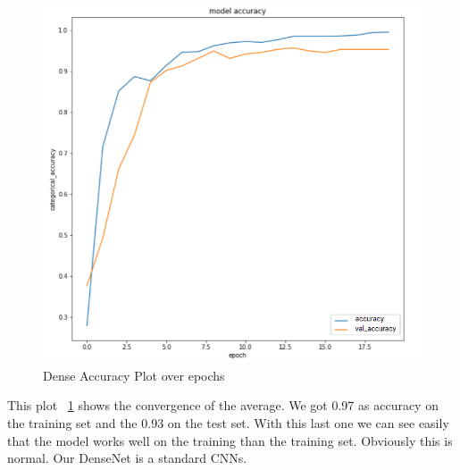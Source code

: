 \documentclass[a4paper]{article}
\begin{document}
   \begin{figure}[H]
        \includegraphics[width=\linewidth]{images/new_one.png}
            \caption{Dense Accuracy Plot over epochs}
        \label{fig:dense_accu}
        \end{figure}    
This plot ~\ref{fig:dense_accu} shows the convergence of the average. We got 0.97 as accuracy on the training set and the 0.93 on the test set. With this last one we can see easily that the model works well on the training than the training set. Obviously this is normal. Our DenseNet is a standard CNNs.
\end{document}
